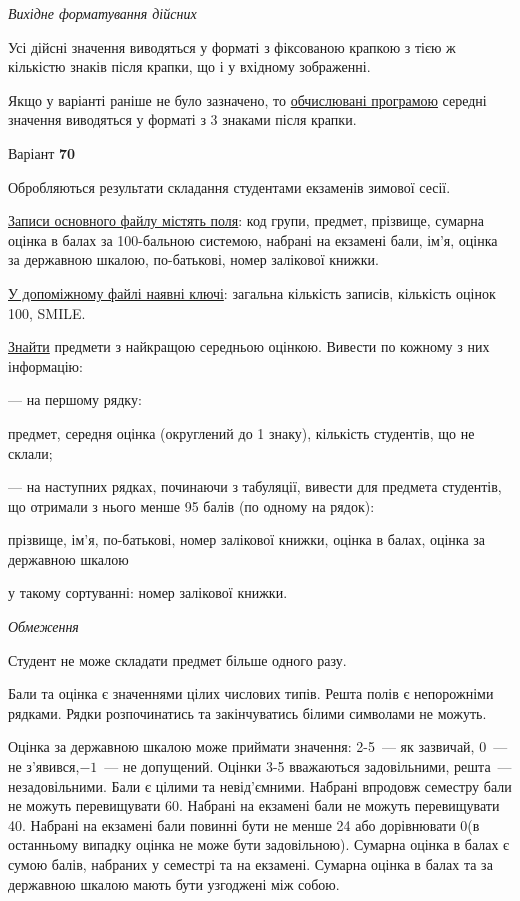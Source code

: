 \documentclass[11pt, ukrainian]{article}
\begin{document}
\textit{Вихідне форматування дійсних}

Усі дійсні значення виводяться у форматі з фіксованою крапкою з тією ж кількістю знаків після крапки, що і у вхідному зображенні.

Якщо у варіанті раніше не було зазначено, то \underline{обчислювані програмою} середні значення виводяться у форматі з 3 знаками після крапки.




\par
\newpage
{\center Варіант  \No \textbf { 70 }\par}
\bigskip
Обробляються результати складання студентами екзаменів зимової сесії.

\underline{Записи основного файлу містять поля}: код групи, предмет, прізвище, сумарна оцінка в балах за 100-бальною системою, набрані на екзамені бали, ім’я, оцінка за державною шкалою, по-батькові, номер залікової книжки.

\underline{У допоміжному файлі наявні ключі}: загальна кількість записів, кількість оцінок 100, SMILE.

\underline{Знайти} предмети з найкращою середньою оцінкою. Вивести по кожному з них інформацію:\par
{\noindent}--- на першому рядку:\par
предмет, середня оцінка (округлений до 1 знаку), кількість студентів, що не склали;

{\noindent}--- на наступних рядках, починаючи з табуляції, вивести для предмета студентів, що отримали з нього менше 95 балів (по одному на рядок):\par
прізвище, ім’я, по-батькові, номер залікової книжки, оцінка в балах, оцінка за державною шкалою

{\noindent}у такому сортуванні: номер залікової книжки.


\bigskip\textit{Обмеження}

Студент не може складати предмет більше одного разу.

Бали та оцінка є значеннями цілих числових типів. Решта полів є непорожніми рядками.
Рядки розпочинатись та закінчуватись білими символами не можуть.

Оцінка за державною шкалою може приймати значення: 2-5~--- як зазвичай, 0~--- не з’явився,$-1$~--- не допущений. 
Оцінки 3-5 вважаються задовільними, решта~--- незадовільними. 
Бали є цілими та невід’ємними.
Набрані впродовж семестру бали не можуть перевищувати 60. 
Набрані на екзамені бали не можуть перевищувати 40. 
Набрані на екзамені бали повинні бути не менше 24 або дорівнювати 0(в останньому випадку оцінка не може бути задовільною). 
Сумарна оцінка в балах є сумою балів, набраних у семестрі та на екзамені.
Сумарна оцінка в балах та за державною шкалою мають бути узгоджені між собою.
\end{document}
